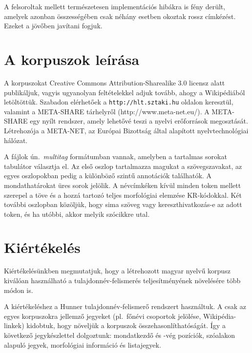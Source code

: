\documentclass{llncs}
\begin{document}
A felsoroltak mellett természetesen implementációs hibákra is fény derült, amelyek azonban összességében 
csak néhány esetben okoztak rossz címkézést. Ezeket a jövőben javítani fogjuk. 


\section{A korpuszok leírása}
\label{desc}

A korpuszokat Creative Commons Attribution-Sharealike 3.0 licensz alatt publikáljuk, vagyis ugyanolyan feltételekkel adjuk tovább, ahogy a Wikipédiából letöltöttük. Szabadon elérhetőek a \texttt{http://hlt.sztaki.hu} oldalon keresztül, valamint a META-SHARE tárhelyről (http://www.meta-net.eu/). A META-SHARE egy nyílt rendszer, amely lehetővé teszi a nyelvi erőforrások megosztását. Létrehozója a META-NET, az Európai Bizottság által alapított nyelvtechnológiai hálózat.

A fájlok ún.~\emph{multitag} formátumban vannak, amelyben a tartalmas sorokat tabulátor választja el. Az első oszlop tartalmazza magukat a szövegszavakat, az egyes oszlopokban pedig a különböző szintű annotációk találhatók. A mondathatárokat üres sorok jelölik. A névcímkéken kívül minden token mellett szerepel a töve és a hozzá tartozó teljes morfológiai elemzése KR-kódokkal. Két további oszlopban közöljük, hogy sima szöveg vagy kereszthivatkozás-e az adott token, és ha utóbbi, akkor melyik szócikkre utal. 

\section{Kiértékelés}
\label{results}

Kiértékelésünkben megmutatjuk, hogy a létrehozott magyar nyelvű korpusz kiválóan használható a tulajdonnév-felismerés teljesítményének növelésére több módon is. 

A kiértékeléshez a Hunner \cite{Varga} tulajdonnév-felismerő rendszert használtuk. A csak az egyes korpuszokra jellemző jegyeket (pl.~főnévi csoportok jelölése, Wikipédia-linkek) kidobtuk, hogy növeljük a korpuszok összehasonlíthatóságát. Így a következő jegykészlettel dolgoztunk: mondatkezdő és -vég pozíciók, szóalakon alapuló jegyek, morfológiai információ és listajegyek. 
\end{document}
